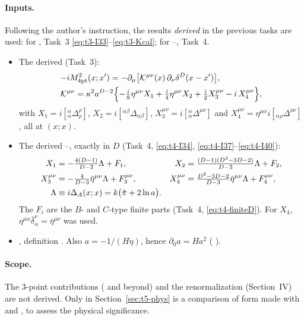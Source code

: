 \paragraph{Inputs.} Following the author's instruction, the results \emph{derived} in the previous
tasks are used: for , Task~3 \eqref{eq:t3-I33}--\eqref{eq:t3-Kcal}; for --,
Task~4.
\begin{itemize}[leftmargin=2.6em]
\item[(G1)] The derived  \tD{} (Task~3):
\begin{equation}\label{eq:t5-G1}
\begin{aligned}
\relax&{-i}M^2_{\rm 4pt}(x;x')=-\partial_\mu\bigl[\mathcal K^{\mu\nu}(x)\,\partial_\nu\delta^D(x-x')\bigr],\\
&\mathcal K^{\mu\nu}=\kappa^2a^{D-2}\Bigl\{-\tfrac i8\eta^{\mu\nu}X_1+\tfrac i4\eta^{\mu\nu}X_2+\tfrac i2X_3^{\mu\nu}-i\,X_4^{\mu\nu}\Bigr\},
\end{aligned}
\end{equation}
with \(X_1=i[{}^\alpha_\alpha\Delta^\rho_\rho]\), \(X_2=i[{}^{\alpha\beta}\Delta_{\alpha\beta}]\),
\(X_3^{\mu\nu}=i[{}^\alpha_\alpha\Delta^{\mu\nu}]\) and
\(X_4^{\mu\nu}=\eta^{\mu\alpha}i[{}_{\alpha\rho}\Delta^{\rho\nu}]\), all at \((x;x)\).
\item[(G2)] The derived --, exactly in \(D\) \tD{} (Task~4,
\eqref{eq:t4-I34}, \eqref{eq:t4-I37}--\eqref{eq:t4-I40}):
\begin{equation}\label{eq:t5-G2}
\begin{aligned}
X_1&=-\tfrac{4(D-1)}{D-3}\Lambda+F_1, & X_2&=\tfrac{(D-1)(D^2-3D-2)}{D-3}\Lambda+F_2,\\
X_3^{\mu\nu}&=-\tfrac{4}{D-3}\bar\eta^{\mu\nu}\Lambda+F_3^{\mu\nu}, & X_4^{\mu\nu}&=\tfrac{D^2-3D-2}{D-3}\bar\eta^{\mu\nu}\Lambda+F_4^{\mu\nu},\\
\Lambda&\equiv i\Delta_A(x;x)=k\bigl(\hat\pi+2\ln a\bigr). &&
\end{aligned}
\end{equation}
The \(F_i\) are the \(B\)- and \(C\)-type finite parts (Task~4, \eqref{eq:t4-finiteD}). For
\(X_4\), \(\eta^{\mu\alpha}\bar\delta^\nu_\alpha=\bar\eta^{\mu\nu}\) was used.
\item[(G3)] \PI{} , definition \tP. Also \(a=-1/(H\eta)\), hence \(\partial_0a=Ha^2\) (\PI{} ).
\end{itemize}

\paragraph{Scope.} The 3-point contributions ( and beyond) and the renormalization
(Section~IV) are not derived. Only in Section~\ref{sec:t5-phys} is a comparison of form made
with  and , to assess the physical significance.

